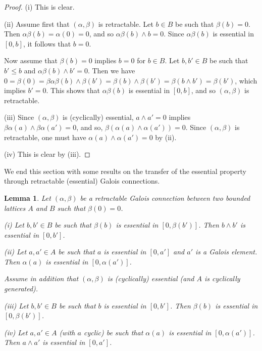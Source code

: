\documentclass[11pt,a4paper]{amsart}
\newtheorem{lem}[theorem]{Lemma}
\begin{document}
\begin{proof} (i) This is clear. 

(ii) Assume first that $(\alpha,\beta)$ is retractable. Let $b\in B$ be such that $\beta(b)=0$. Then
$\alpha\beta(b)=\alpha(0)=0$, and so $\alpha\beta(b)\wedge b=0$. Since $\alpha\beta(b)$ is essential in $[0,b]$,
it follows that $b=0$.

Now assume that $\beta(b)=0$ implies $b=0$ for $b\in B$. Let $b,b'\in B$ be such that $b'\leq b$ and
$\alpha\beta(b)\wedge b'=0$. Then we have $0=\beta(0)=\beta\alpha\beta(b)\wedge \beta(b')=\beta(b)\wedge
\beta(b')=\beta(b\wedge b')=\beta(b')$, which implies $b'=0$. This shows that $\alpha\beta(b)$ is essential in
$[0,b]$, and so $(\alpha,\beta)$ is retractable.

(iii) Since $(\alpha,\beta)$ is (cyclically) essential, $a\wedge a'=0$ implies $\beta\alpha(a)\wedge \beta\alpha(a')=0$,
and so, $\beta(\alpha(a)\wedge \alpha(a'))=0$. Since $(\alpha,\beta)$ is retractable, one must have $\alpha(a)\wedge
\alpha(a')=0$ by (ii).  

(iv) This is clear by (iii).
\end{proof}

We end this section with some results on the transfer of the essential property through retractable (essential)
Galois connections.

\begin{lem} \label{l:transfer} Let $(\alpha,\beta)$ be a retractable Galois connection between two bounded lattices $A$
and $B$ such that $\beta(0)=0$. 

(i) Let $b,b'\in B$ be such that $\beta(b)$ is essential in $[0,\beta(b')]$. Then $b\wedge b'$ is essential in
$[0,b']$.

(ii) Let $a,a'\in A$ be such that $a$ is essential in $[0,a']$ and $a'$ is a Galois element. Then $\alpha(a)$ is
essential in $[0,\alpha(a')]$. 

Assume in addition that $(\alpha,\beta)$ is (cyclically) essential (and $A$ is cyclically generated).

(iii) Let $b,b'\in B$ be such that $b$ is essential in $[0,b']$. Then $\beta(b)$ is essential in $[0,\beta(b')]$.

(iv) Let $a,a'\in A$ (with $a$ cyclic) be such that $\alpha(a)$ is essential in $[0,\alpha(a')]$. Then $a\wedge a'$ is
essential in $[0,a']$. 
\end{lem}
\end{document}
